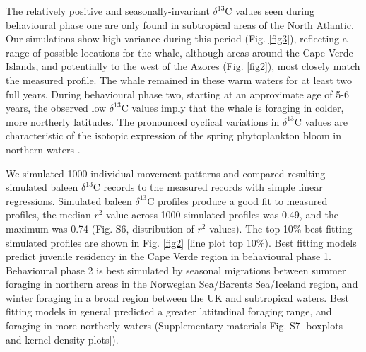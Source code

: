 \documentclass[a4paper,12pt]{article}
\begin{document}
 
The relatively positive and seasonally-invariant $\delta^{13}$C values seen during behavioural phase one are only found in subtropical areas of the North Atlantic.  
Our simulations show high variance during this period (Fig. \ref{fig3}), reflecting a range of possible locations for the whale, although areas around the Cape Verde Islands, and potentially to the west of the Azores (Fig. \ref{fig2}), most closely match the measured profile. 
The whale remained in these warm waters for at least two full years. 
During behavioural phase two, starting at an approximate age of 5-6 years, the observed low $\delta^{13}$C values imply that the whale is foraging in colder, more northerly latitudes. 
The pronounced cyclical variations in $\delta^{13}$C values are characteristic of the isotopic expression of the spring phytoplankton bloom in northern waters \cite{magozzi2017using}.  

We simulated 1000 individual movement patterns and compared resulting simulated baleen $\delta^{13}$C records to the measured records with simple linear regressions. 
Simulated baleen $\delta^{13}$C profiles produce a good fit to measured profiles, the median $r^2$ value across 1000 simulated profiles was 0.49, and the maximum was 0.74 (Fig. S6, distribution of $r^2$ values). 
The top 10\% best fitting simulated profiles are shown in Fig. \ref{fig2} [line plot top 10\%). 
Best fitting models predict juvenile residency in the Cape Verde region in behavioural phase 1. 
Behavioural phase 2 is best simulated by seasonal migrations between summer foraging in northern areas in the Norwegian Sea/Barents Sea/Iceland region, and winter foraging in a broad region between the UK and subtropical waters. 
Best fitting models in general predicted a greater latitudinal foraging range, and foraging in more northerly waters (Supplementary materials Fig. S7 [boxplots and kernel density plots]).
\end{document}
